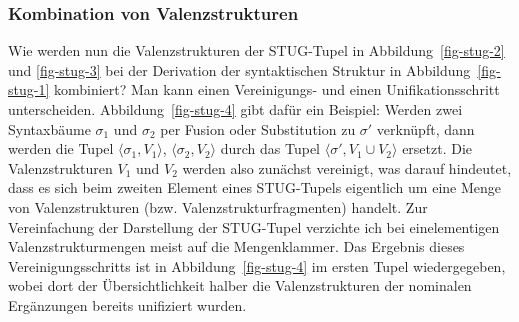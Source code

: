 \subsubsection*{Kombination von Valenzstrukturen}    

Wie werden nun die Valenzstrukturen der STUG-Tupel in Abbildung~\ref{fig-stug-2} und \ref{fig-stug-3} bei der Derivation der syntaktischen Struktur in Abbildung~\ref{fig-stug-1} kombiniert? Man kann einen Vereini\-gungs- und einen Unifikationsschritt unterscheiden. Abbildung~\ref{fig-stug-4} gibt dafür ein Beispiel: Werden zwei Syntaxbäume $\sigma_1$ und $\sigma_2$ per Fusion oder Substitution zu $\sigma'$ verknüpft, dann werden die Tupel $\langle \sigma_1, V_1 \rangle$, $\langle \sigma_2, V_2 \rangle$ durch das Tupel $\langle \sigma', V_1 \cup V_2 \rangle$ ersetzt. Die Valenzstrukturen $V_1$ und $V_2$ werden also zunächst vereinigt, was darauf hindeutet, dass es sich beim zweiten Element eines STUG-Tupels eigentlich um eine Menge von Valenzstrukturen (bzw. Valenzstrukturfragmenten) handelt. Zur Vereinfachung der Darstellung der STUG-Tupel verzichte ich bei einelementigen Valenzstrukturmengen meist auf die Mengenklammer. Das Ergebnis dieses Vereinigungsschritts ist in Abbildung~\ref{fig-stug-4} im ersten Tupel wiedergegeben, wobei dort der Übersichtlichkeit halber die Valenzstrukturen der nominalen Ergänzungen bereits unifiziert wurden.
